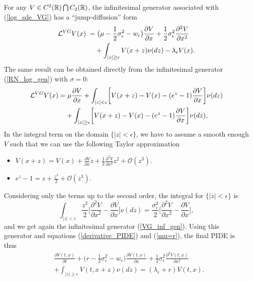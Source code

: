 For any $V\in C^2(\mathbb{R}) \bigcap C_2(\mathbb{R})$, the infinitesimal generator associated with (\ref{log_sde_VG}) has a ``jump-diffusion'' form
\begin{align}\label{VG_inf_gen}
\mathcal{L}^{VG} V(x) \; =& \; \bigl( \mu-\frac{1}{2}\sigma_{\epsilon}^2 - w_{\epsilon} \bigr) \frac{\partial V}{\partial x} 
+ \frac{1}{2}\sigma_{\epsilon}^2 \frac{\partial^2 V}{\partial x^2} \\ \nonumber
&+ \int_{|z| \geq \epsilon} V(x+z) \nu(dz) - \lambda_{\epsilon} V(x).
\end{align}
The same result can be obtained directly from the infinitesimal generator (\ref{RN_log_gen}) with $\sigma =0$:
\begin{align*}
\mathcal{L}^{VG} V(x) =& \; \mu \frac{\partial V}{\partial x}
+ \int_{|z| < \epsilon}
\biggl[ V(x+z) - V(x) - (e^z-1)\frac{\partial V}{\partial x} \biggr] \nu(dz) \\
&+ \int_{|z| \geq \epsilon}
\biggl[ V(x+z) - V(x) - (e^z-1)\frac{\partial V}{\partial x} \biggr] \nu(dz),
\end{align*}
In the integral term on the domain $\{ |z|<\epsilon \}$, we have to assume a smooth enough $V$ such that we can use the following Taylor approximation
\begin{itemize}
 \item $V(x+z) = V(x) + \frac{\partial V}{\partial x} z + \frac{1}{2} \frac{\partial^2 V}{\partial x^2} z^2 + \mathcal{O}(z^3)$.
 \item $e^z-1 = z + \frac{z^2}{2} + \mathcal{O}(z^3) $.
\end{itemize}
Considering only the terms up to the second order, the integral for $\{ |z| < \epsilon \}$ is
\begin{equation*}
 \int_{|z| < \epsilon} \frac{z^2}{2}
\biggl[ \frac{\partial^2 V}{\partial x^2} - \frac{\partial V}{\partial x} \biggr] \nu(dz)
= \frac{\sigma_{\epsilon}^2}{2} \biggl[ \frac{\partial^2 V}{\partial x^2} - \frac{\partial V}{\partial x} \biggr],
\end{equation*}
and we get again the infinitesimal generator (\ref{VG_inf_gen}).
Using this generator and equations (\ref{derivative_PIDE}) and (\ref{mu=r}), the final PIDE is thus
\begin{align}\label{VG_JD}
&  \frac{\partial V(t,x)}{\partial t} +
 \bigl( r-\frac{1}{2}\sigma_{\epsilon}^2 - w_{\epsilon} \bigr) \frac{\partial V(t,x)}{\partial x} 
 + \frac{1}{2}\sigma_{\epsilon}^2 \frac{\partial^2 V(t,x)}{\partial x^2} \\ \nonumber
 &+ \int_{|z| \geq \epsilon} V(t,x+z) \nu(dz) = (\lambda_{\epsilon} + r) V(t,x).
\end{align}

